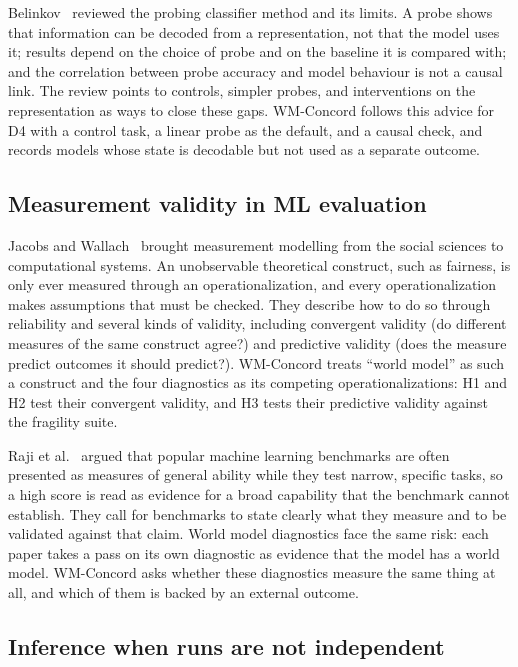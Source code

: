 \documentclass[11pt]{scrartcl}
\begin{document}
Belinkov~\cite{belinkov2022probing} reviewed the probing classifier method and its limits. A probe shows that
information can be decoded from a representation, not that the model uses it; results depend on the choice of
probe and on the baseline it is compared with; and the correlation between probe accuracy and model behaviour
is not a causal link. The review points to controls, simpler probes, and interventions on the representation
as ways to close these gaps. WM-Concord follows this advice for D4 with a control task, a linear probe as the
default, and a causal check, and records models whose state is decodable but not used as a separate outcome.

\subsection{Measurement validity in ML evaluation}

Jacobs and Wallach~\cite{jacobs2021measurement} brought measurement modelling from the social sciences to
computational systems. An unobservable theoretical construct, such as fairness, is only ever measured through
an operationalization, and every operationalization makes assumptions that must be checked. They describe how
to do so through reliability and several kinds of validity, including convergent validity (do different
measures of the same construct agree?) and predictive validity (does the measure predict outcomes it should
predict?). WM-Concord treats ``world model'' as such a construct and the four diagnostics as its competing
operationalizations: H1 and H2 test their convergent validity, and H3 tests their predictive validity against
the fragility suite.

Raji et al.~\cite{raji2021benchmark} argued that popular machine learning benchmarks are often presented as
measures of general ability while they test narrow, specific tasks, so a high score is read as evidence for a
broad capability that the benchmark cannot establish. They call for benchmarks to state clearly what they
measure and to be validated against that claim. World model diagnostics face the same risk: each paper takes
a pass on its own diagnostic as evidence that the model has a world model. WM-Concord asks whether these
diagnostics measure the same thing at all, and which of them is backed by an external outcome.

\subsection{Inference when runs are not independent}
\end{document}
